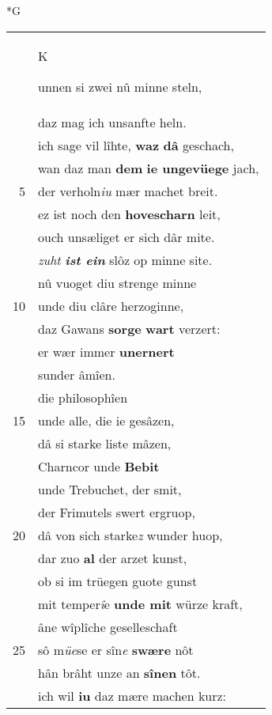 \documentclass[8pt,a4paper,notitlepage]{article}
\begin{document}
\newpage
\begin{table}[ht]
\begin{minipage}[t]{0.5\linewidth}
\small
\begin{center}*G
\end{center}
\begin{tabular}{rl}
 & \begin{large}K\end{large}unnen si zwei nû minne steln,\\ 
 & daz mag ich unsanfte heln.\\ 
 & ich sage vil lîhte, \textbf{waz} \textbf{dâ} geschach,\\ 
 & wan daz man \textbf{dem} \textbf{ie ungevüege} jach,\\ 
5 & der verholn\textit{iu} mær machet breit.\\ 
 & ez ist noch den \textbf{hovescharn} leit,\\ 
 & ouch unsæliget er sich dâr mite.\\ 
 & \textit{zuht} \textit{\textbf{ist ein}} slôz op minne site.\\ 
 & nû vuoget diu strenge minne\\ 
10 & unde diu clâre herzoginne,\\ 
 & daz Gawans \textbf{sorge} \textbf{wart} verzert:\\ 
 & er wær immer \textbf{unernert}\\ 
 & sunder âmîen.\\ 
 & die philosophîen\\ 
15 & unde alle, die ie gesâzen,\\ 
 & dâ si starke liste mâzen,\\ 
 & Charncor unde \textbf{Bebit}\\ 
 & unde Trebuchet, der smit,\\ 
 & der Frimutels swert ergruop,\\ 
20 & dâ von sich starke\textit{z} wunder huop,\\ 
 & dar zuo \textbf{al} der arzet kunst,\\ 
 & ob si im trüegen guote gunst\\ 
 & mit temper\textit{î}e \textbf{unde mit} würze kraft,\\ 
 & âne wîplîche geselleschaft\\ 
25 & sô m\textit{üe}se er sîn\textit{e} \textbf{swære} nôt\\ 
 & hân brâht unze an \textbf{sînen} tôt.\\ 
 & ich wil \textbf{iu} daz mære machen kurz:\\ 

\end{tabular}
\end{minipage}
\end{table}
\end{document}
